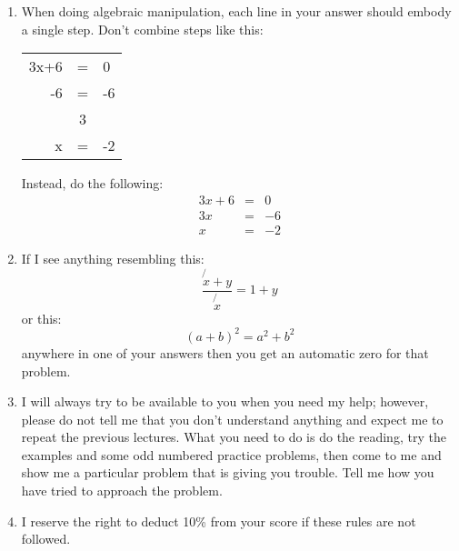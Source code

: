 \documentclass[letterpaper,12pt,fleqn]{article}
\begin{document}
\begin{enumerate}
\item When doing algebraic manipulation, each line in your answer should
  embody a single step. Don't combine steps like this:

\begin{tabular}{rcl}
3x+6 & = & 0 \\
-6 & = & -6 \\
\hline
 & 3 & \\
x & = & -2
\end{tabular}

Instead, do the following:
\begin{eqnarray*}
3x+6 &=& 0 \\
3x &=& -6 \\
x &=& -2
\end{eqnarray*}

\item If I see anything resembling this:
\[\frac{\not{x}+y}{\not{x}} = 1+y\]
or this:
\[(a+b)^2=a^2+b^2\]
anywhere in one of your answers then you get an automatic zero for that problem.

\item I will always try to be available to you when you need my help; however,
  please do not tell me that you don't understand anything and expect me to
  repeat the previous lectures. What you need to do is do the reading, try
  the examples and some odd numbered practice problems, then come to me and show
  me a particular problem that is giving you trouble. Tell me how you have
  tried to approach the problem.

\item I reserve the right to deduct 10\% from your score if these rules are
  not followed.
\end{enumerate}
\end{document}

